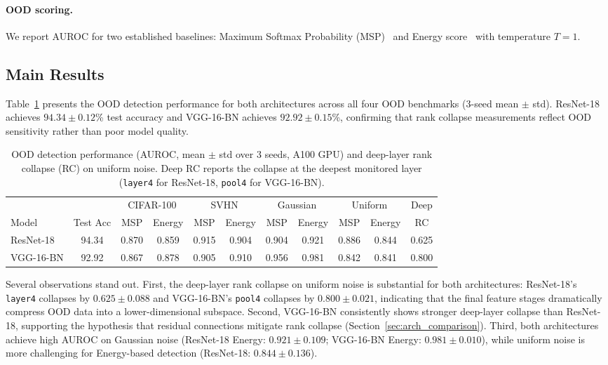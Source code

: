 \documentclass{article}
\begin{document}
\paragraph{OOD scoring.} We report AUROC for two established baselines: Maximum Softmax Probability (MSP)~\citep{hendrycks2017baseline} and Energy score~\citep{liu2020energy} with temperature $T = 1$.

\subsection{Main Results}
\label{sec:main_results}

Table~\ref{tab:main} presents the OOD detection performance for both architectures across all four OOD benchmarks (3-seed mean $\pm$ std). ResNet-18 achieves $94.34 \pm 0.12$\% test accuracy and VGG-16-BN achieves $92.92 \pm 0.15$\%, confirming that rank collapse measurements reflect OOD sensitivity rather than poor model quality.

\begin{table}[t]
\centering
\caption{OOD detection performance (AUROC, mean $\pm$ std over 3 seeds, A100 GPU) and deep-layer rank collapse (RC) on uniform noise. Deep RC reports the collapse at the deepest monitored layer (\texttt{layer4} for ResNet-18, \texttt{pool4} for VGG-16-BN).}
\label{tab:main}
\small
\begin{tabular}{@{}lcccccccccc@{}}
\toprule
& & \multicolumn{2}{c}{CIFAR-100} & \multicolumn{2}{c}{SVHN} & \multicolumn{2}{c}{Gaussian} & \multicolumn{2}{c}{Uniform} & Deep \\
\cmidrule(lr){3-4} \cmidrule(lr){5-6} \cmidrule(lr){7-8} \cmidrule(lr){9-10}
Model & Test Acc & MSP & Energy & MSP & Energy & MSP & Energy & MSP & Energy & RC \\
\midrule
ResNet-18 & 94.34 & 0.870 & 0.859 & 0.915 & 0.904 & 0.904 & 0.921 & 0.886 & 0.844 & 0.625 \\
VGG-16-BN & 92.92 & 0.867 & 0.878 & 0.905 & 0.910 & 0.956 & 0.981 & 0.842 & 0.841 & 0.800 \\
\bottomrule
\end{tabular}
\end{table}

Several observations stand out. First, the deep-layer rank collapse on uniform noise is substantial for both architectures: ResNet-18's \texttt{layer4} collapses by $0.625 \pm 0.088$ and VGG-16-BN's \texttt{pool4} collapses by $0.800 \pm 0.021$, indicating that the final feature stages dramatically compress OOD data into a lower-dimensional subspace. Second, VGG-16-BN consistently shows stronger deep-layer collapse than ResNet-18, supporting the hypothesis that residual connections mitigate rank collapse (Section~\ref{sec:arch_comparison}). Third, both architectures achieve high AUROC on Gaussian noise (ResNet-18 Energy: $0.921 \pm 0.109$; VGG-16-BN Energy: $0.981 \pm 0.010$), while uniform noise is more challenging for Energy-based detection (ResNet-18: $0.844 \pm 0.136$).
\end{document}
